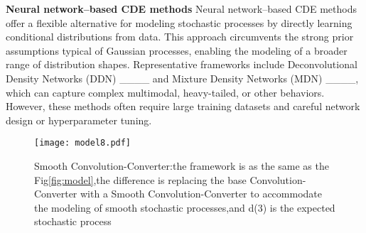 \noindent \textbf{Neural network–based CDE methods}   Neural network–based CDE methods offer a flexible alternative for modeling stochastic processes by directly learning conditional distributions from data. This approach circumvents the strong prior assumptions typical of Gaussian processes, enabling the modeling of a broader range of distribution shapes. Representative frameworks include Deconvolutional Density Networks (DDN) ____ and Mixture Density Networks (MDN) ____, which can capture complex multimodal, heavy-tailed, or other behaviors. However, these methods often require large training datasets and careful network design or hyperparameter tuning.
\begin{figure*}[htbp]
  \centering
  \texttt{[image: model8.pdf]}
  \caption{Smooth Convolution-Converter:the framework is as the same as the Fig\ref{fig:model},the difference is replacing the base Convolution-Converter with a Smooth Convolution-Converter to accommodate the modeling of smooth stochastic processes,and d(3) is the expected stochastic process}
  
  \label{fig:Deconv}
\end{figure*}
